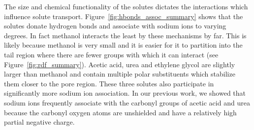 \documentclass[journal=jpcbfk,manuscript=article]{achemso}
\begin{document}
  The size and chemical functionality of the solutes dictates the interactions which
  influence solute transport. Figure~\ref{fig:hbonds_assoc_summary} shows that the
  solutes donate hydrogen bonds and associate with sodium ions to varying degrees.
  In fact methanol interacts the least by these mechanisms by far. This is likely 
  because methanol is very small and it is easier for it to partition into the tail
  region where there are fewer groups with which it can interact (see Figure~\ref{fig:rdf_summary}).
  Acetic acid, urea and ethylene glycol are slightly larger than methanol and contain 
  multiple polar substituents which stabilize them closer to the pore region.
  These three solutes also participate in significantly more sodium ion association. 
  In our previous work, we showed that sodium ions frequently associate with the 
  carbonyl groups of acetic acid and urea because the carbonyl oxygen atoms are
  unshielded and have a relatively high partial negative charge.~\cite{coscia_chemically_2019}
  
\end{document}
